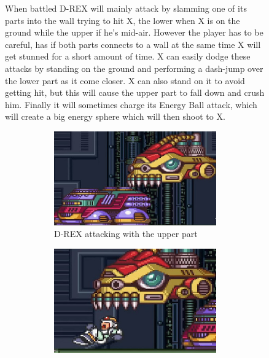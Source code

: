 \begin{figure}[htp]
When battled D-REX will mainly attack by slamming one of its parts into the wall trying to hit X, the lower when X is on the ground while the upper if he's mid-air. However the player has to be careful, has if both parts connects to a wall at the same time X will get stunned for a short amount of time. X can easily dodge these attacks by standing on the ground and performing a dash-jump over the lower part as it come closer. X can also stand on it to avoid getting hit, but this will cause the upper part to fall down and crush him. Finally it will sometimes charge its Energy Ball attack, which will create a big energy sphere which will then shoot to X.
\begin{figure}[htp]
	\centering
	\begin{subfigure}[t]{0.45\linewidth}
		\centering
		\includegraphics[width=\linewidth]{figures/X1/Sigma_stages/Drex_press.jpg}
		\caption{D-REX attacking with the upper part}
	\end{subfigure}
	\begin{subfigure}[t]{0.40\linewidth}
		\centering
		\includegraphics[width=\linewidth]{figures/X1/Sigma_stages/Drex_trip.jpg}

\end{subfigure}
\end{figure}
\end{figure}
